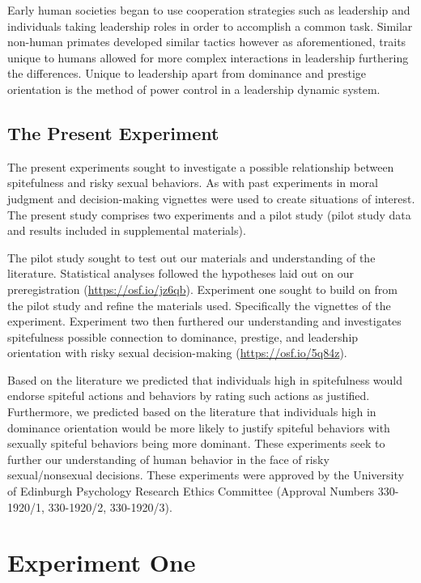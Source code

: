 \documentclass[
  english,
  a4paper]{apa7}
\begin{document}
Early human societies began to use cooperation strategies such as leadership and individuals taking leadership roles in order to accomplish a common task. Similar non-human primates developed similar tactics however as aforementioned, traits unique to humans allowed for more complex interactions in leadership furthering the differences. Unique to leadership apart from dominance and prestige orientation is the method of power control in a leadership dynamic system.

\hypertarget{the-present-experiment}{%
\subsection{The Present Experiment}\label{the-present-experiment}}

The present experiments sought to investigate a possible relationship between spitefulness and risky sexual behaviors. As with past experiments in moral judgment and decision-making vignettes were used to create situations of interest. The present study comprises two experiments and a pilot study (pilot study data and results included in supplemental materials).

The pilot study sought to test out our materials and understanding of the literature. Statistical analyses followed the hypotheses laid out on our preregistration (\url{https://osf.io/jz6qb}). Experiment one sought to build on from the pilot study and refine the materials used. Specifically the vignettes of the experiment. Experiment two then furthered our understanding and investigates spitefulness possible connection to dominance, prestige, and leadership orientation with risky sexual decision-making (\url{https://osf.io/5q84z}).

Based on the literature we predicted that individuals high in spitefulness would endorse spiteful actions and behaviors by rating such actions as justified. Furthermore, we predicted based on the literature that individuals high in dominance orientation would be more likely to justify spiteful behaviors with sexually spiteful behaviors being more dominant. These experiments seek to further our understanding of human behavior in the face of risky sexual/nonsexual decisions. These experiments were approved by the University of Edinburgh Psychology Research Ethics Committee (Approval Numbers 330-1920/1, 330-1920/2, 330-1920/3).

\hypertarget{experiment-one}{%
\section{Experiment One}\label{experiment-one}}
\end{document}
